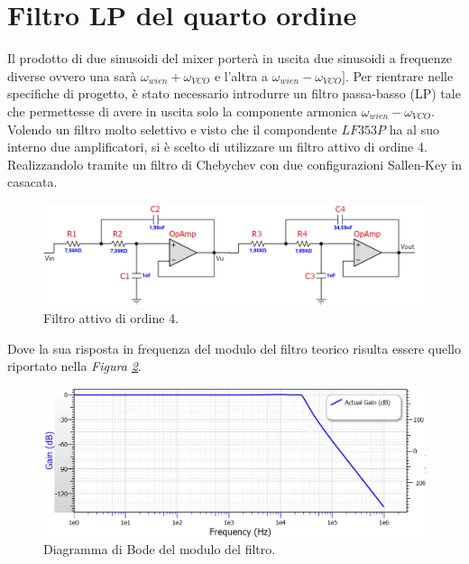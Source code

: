 \documentclass[titlepage]{report}
\begin{document}
\newpage
\section{Filtro LP del quarto ordine}
	Il prodotto di due sinusoidi del mixer porterà in uscita due sinusoidi a frequenze diverse ovvero una sarà $\omega_{wien} + \omega_{VCO}$ e l'altra a $\omega_{wien} - \omega_{VCO}]$. Per rientrare nelle specifiche di progetto, è stato necessario introdurre un filtro passa-basso (LP) tale che permettesse di avere in uscita solo la componente armonica $\omega_{wien} - \omega_{VCO}$.
	\\ 
	Volendo un filtro molto selettivo e visto che il compondente $LF353P$ ha al suo interno due amplificatori, si è scelto di utilizzare un filtro attivo di ordine 4. Realizzandolo tramite un filtro di Chebychev con due configurazioni Sallen-Key in casacata. 
	
	\begin{figure}[h]
		\centering
		\includegraphics[scale=0.9]{Immagini/sch_lp4.png}
		\caption{Filtro attivo di ordine 4.}
		\label{fig:LP4}
	\end{figure}	
	
	Dove la sua risposta in frequenza del modulo del filtro teorico risulta essere quello riportato nella \textit{Figura \ref{fig:BodeLp4}}.
	
	\begin{figure}[h]
		\centering
		\includegraphics[scale=0.9]{Immagini/bode_teorico_lp4.png}
		\caption{Diagramma di Bode del modulo del filtro.}
		\label{fig:BodeLp4}
	\end{figure}
\end{document}
